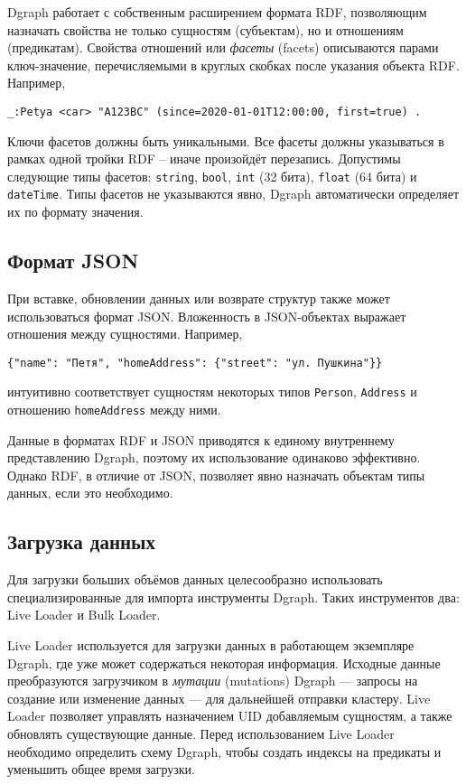 Dgraph работает с собственным расширением формата RDF, позволяющим назначать свойства не только сущностям (субъектам),
но и отношениям (предикатам). Свойства отношений или \textit{фасеты} (facets) описываются парами ключ-значение,
перечисляемыми в круглых скобках после указания объекта RDF. Например,
\begin{Verbatim}
_:Petya <car> "A123BC" (since=2020-01-01T12:00:00, first=true) .
\end{Verbatim}

Ключи фасетов должны быть уникальными. Все фасеты должны указываться в рамках одной тройки RDF -- иначе произойдёт
перезапись. Допустимы следующие типы фасетов: \texttt{string}, \texttt{bool}, \texttt{int} (32 бита), \texttt{float}
(64 бита) и \texttt{dateTime}. Типы фасетов не указываются явно, Dgraph автоматически определяет их по формату
значения.

\subsection{Формат JSON}

При вставке, обновлении данных или возврате структур также может использоваться формат JSON. Вложенность в
JSON-объектах выражает отношения между сущностями. Например,
\begin{Verbatim}
{"name": "Петя", "homeAddress": {"street": "ул. Пушкина"}}
\end{Verbatim}
интуитивно соответствует сущностям некоторых типов \texttt{Person}, \texttt{Address} и отношению \texttt{homeAddress}
между ними.

Данные в форматах RDF и JSON приводятся к единому внутреннему представлению Dgraph, поэтому их использование одинаково
эффективно. Однако RDF, в отличие от JSON, позволяет явно назначать объектам типы данных, если это необходимо.

\subsection{Загрузка данных}

Для загрузки больших объёмов данных целесообразно использовать специализированные для импорта инструменты Dgraph. Таких
инструментов два: Live Loader и Bulk Loader.

Live Loader используется для загрузки данных в работающем экземпляре Dgraph, где уже может содержаться некоторая
информация. Исходные данные преобразуются загрузчиком в \textit{мутации} (mutations) Dgraph --- запросы на создание или
изменение данных --- для дальнейшей отправки кластеру. Live Loader позволяет управлять назначением UID добавляемым
сущностям, а также обновлять существующие данные. Перед использованием Live Loader необходимо определить схему Dgraph,
чтобы создать индексы на предикаты и уменьшить общее время загрузки.


